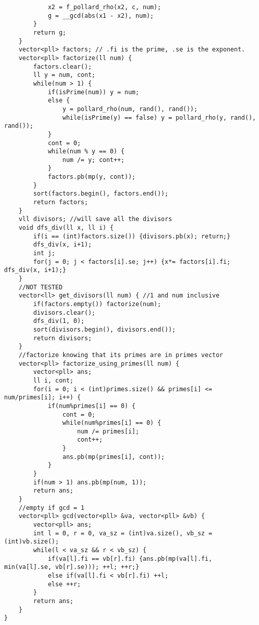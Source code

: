 \documentclass[a4paper,10pt]{article}
\begin{document}
\begin{multicols}{2}
\begin{verbatim}
            x2 = f_pollard_rho(x2, c, num);
            g = __gcd(abs(x1 - x2), num);
        }
        return g;
    }
    vector<pll> factors; // .fi is the prime, .se is the exponent.
    vector<pll> factorize(ll num) {
        factors.clear();
        ll y = num, cont;
        while(num > 1) {
            if(isPrime(num)) y = num;
            else {
                y = pollard_rho(num, rand(), rand());
                while(isPrime(y) == false) y = pollard_rho(y, rand(), rand());
            }
            cont = 0;
            while(num % y == 0) {
                num /= y; cont++;
            }
            factors.pb(mp(y, cont));
        }
        sort(factors.begin(), factors.end());
        return factors;
    }
    vll divisors; //will save all the divisors
    void dfs_div(ll x, ll i) {
        if(i == (int)factors.size()) {divisors.pb(x); return;}
        dfs_div(x, i+1);
        int j;
        for(j = 0; j < factors[i].se; j++) {x*= factors[i].fi; dfs_div(x, i+1);}
    }
    //NOT TESTED
    vector<ll> get_divisors(ll num) { //1 and num inclusive
        if(factors.empty()) factorize(num);
        divisors.clear();
        dfs_div(1, 0);
        sort(divisors.begin(), divisors.end());
        return divisors;
    }
    //factorize knowing that its primes are in primes vector
    vector<pll> factorize_using_primes(ll num) {
        vector<pll> ans;
        ll i, cont;
        for(i = 0; i < (int)primes.size() && primes[i] <= num/primes[i]; i++) {
            if(num%primes[i] == 0) { 
                cont = 0;
                while(num%primes[i] == 0) {
                    num /= primes[i];
                    cont++;
                }
                ans.pb(mp(primes[i], cont));
            }
        }
        if(num > 1) ans.pb(mp(num, 1));
        return ans;
    }
    //empty if gcd = 1
    vector<pll> gcd(vector<pll> &va, vector<pll> &vb) {
        vector<pll> ans;
        int l = 0, r = 0, va_sz = (int)va.size(), vb_sz = (int)vb.size();
        while(l < va_sz && r < vb_sz) {
            if(va[l].fi == vb[r].fi) {ans.pb(mp(va[l].fi, min(va[l].se, vb[r].se))); ++l; ++r;}
            else if(va[l].fi < vb[r].fi) ++l;
            else ++r;
        }
        return ans;
    }
}
\end{verbatim}
\end{multicols}
\end{document}
